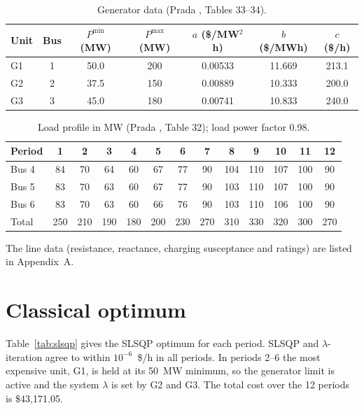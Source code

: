 \begin{table}[H]
\centering
\caption{Generator data (Prada \cite{prada2017}, Tables 33--34).}
\label{tab:gen}
\begin{tabular}{lcccccc}
\toprule
Unit & Bus & $P^{\min}$ (MW) & $P^{\max}$ (MW) & $a$ (\$/MW$^2$h) & $b$ (\$/MWh) & $c$ (\$/h)\\
\midrule
G1 & 1 & 50.0 & 200 & 0.00533 & 11.669 & 213.1\\
G2 & 2 & 37.5 & 150 & 0.00889 & 10.333 & 200.0\\
G3 & 3 & 45.0 & 180 & 0.00741 & 10.833 & 240.0\\
\bottomrule
\end{tabular}
\end{table}

\begin{table}[H]
\centering
\caption{Load profile in MW (Prada \cite{prada2017}, Table 32); load power factor 0.98.}
\label{tab:load}
\small
\begin{tabular}{lcccccccccccc}
\toprule
Period & 1 & 2 & 3 & 4 & 5 & 6 & 7 & 8 & 9 & 10 & 11 & 12\\
\midrule
Bus 4 & 84 & 70 & 64 & 60 & 67 & 77 & 90 & 104 & 110 & 107 & 100 & 90\\
Bus 5 & 83 & 70 & 63 & 60 & 67 & 77 & 90 & 103 & 110 & 107 & 100 & 90\\
Bus 6 & 83 & 70 & 63 & 60 & 66 & 76 & 90 & 103 & 110 & 106 & 100 & 90\\
\midrule
Total & 250 & 210 & 190 & 180 & 200 & 230 & 270 & 310 & 330 & 320 & 300 & 270\\
\bottomrule
\end{tabular}
\end{table}

The line data (resistance, reactance, charging susceptance and ratings) are listed in Appendix~A.

\section{Classical optimum}
Table~\ref{tab:slsqp} gives the SLSQP optimum for each period. SLSQP and $\lambda$-iteration agree to within $10^{-6}$~\$/h in all periods. In periods 2--6 the most expensive unit, G1, is held at its 50~MW minimum, so the generator limit is active and the system $\lambda$ is set by G2 and G3. The total cost over the 12 periods is \$43{,}171.05.

